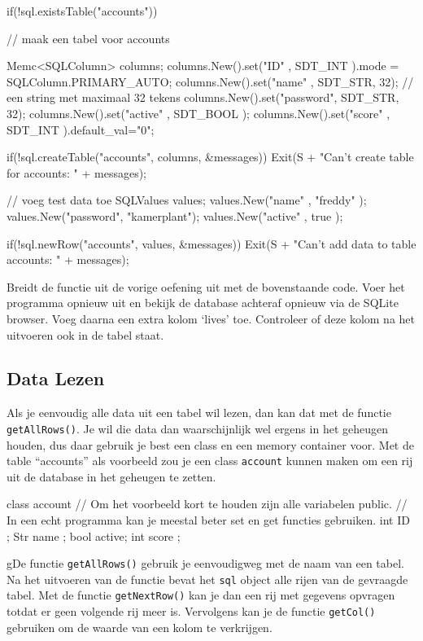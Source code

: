 \begin{code}
if(!sql.existsTable("accounts")) {
  // maak een tabel voor accounts
	
	Memc<SQLColumn> columns;
	columns.New().set("ID"      , SDT_INT    ).mode = SQLColumn.PRIMARY_AUTO;
	columns.New().set("name"    , SDT_STR, 32); // een string met maximaal 32 tekens
	columns.New().set("password", SDT_STR, 32);
	columns.New().set("active"  , SDT_BOOL   );
	columns.New().set("score"   , SDT_INT    ).default_val="0";
	
	if(!sql.createTable("accounts", columns, &messages)) {
	  Exit(S + "Can't create table for accounts: \n" + messages);
	}
	
	// voeg test data toe
	SQLValues values;
	values.New("name"    , "freddy"    );
	values.New("password", "kamerplant");
	values.New("active"  , true        );
	
	if(!sql.newRow("accounts", values, &messages)) {
	  Exit(S + "Can't add data to table accounts: \n" + messages);
	}
}
\end{code}

\begin{exercise}
Breidt de functie  uit de vorige oefening uit met de bovenstaande code. Voer het programma opnieuw uit en bekijk de database achteraf opnieuw via de SQLite browser. Voeg daarna een extra kolom `lives' toe. Controleer of deze kolom na het uitvoeren ook in de tabel staat.
\end{exercise}

\subsection{Data Lezen}
Als je eenvoudig alle data uit een tabel wil lezen, dan kan dat met de functie \texttt{getAllRows()}. Je wil die data dan waarschijnlijk wel ergens in het geheugen houden, dus daar gebruik je best een class en een memory container voor. Met de table ``accounts'' als voorbeeld zou je een class \texttt{account} kunnen maken om een rij uit de database in het geheugen te zetten.

\begin{code}
class account {
  // Om het voorbeeld kort te houden zijn alle variabelen public.
	// In een echt programma kan je meestal beter set en get functies gebruiken.
	int  ID    ; 
	Str  name  ;
	bool active;
	int  score ;
}
\end{code}

gDe functie \texttt{getAllRows()} gebruik je eenvoudigweg met de naam van een tabel. Na het uitvoeren van de functie bevat het \texttt{sql} object alle rijen van de gevraagde tabel. Met de functie \texttt{getNextRow()} kan je dan een rij met gegevens opvragen totdat er geen volgende rij meer is. Vervolgens kan je de functie \texttt{getCol()} gebruiken om de waarde van een kolom te verkrijgen. 

